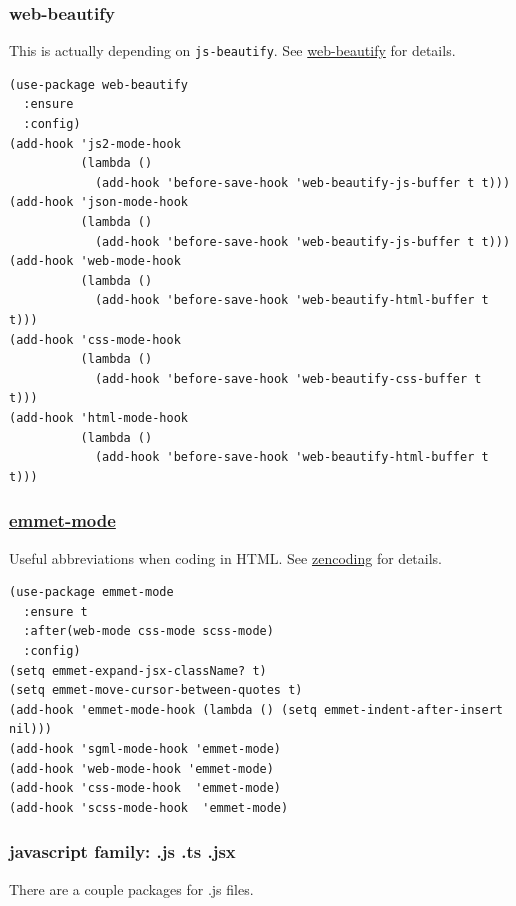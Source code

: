 \documentclass[11pt]{article}
\begin{document}
\subsubsection{web-beautify}
\label{sec:orgb7eb209}
This is actually depending on \texttt{js-beautify}. See \href{https://github.com/yasuyk/web-beautify}{web-beautify} for
details.

\begin{verbatim}
(use-package web-beautify
  :ensure
  :config)
(add-hook 'js2-mode-hook
          (lambda ()
            (add-hook 'before-save-hook 'web-beautify-js-buffer t t)))
(add-hook 'json-mode-hook
          (lambda ()
            (add-hook 'before-save-hook 'web-beautify-js-buffer t t)))
(add-hook 'web-mode-hook
          (lambda ()
            (add-hook 'before-save-hook 'web-beautify-html-buffer t t)))
(add-hook 'css-mode-hook
          (lambda ()
            (add-hook 'before-save-hook 'web-beautify-css-buffer t t)))
(add-hook 'html-mode-hook
          (lambda ()
            (add-hook 'before-save-hook 'web-beautify-html-buffer t t)))
\end{verbatim}
\subsubsection{\href{https://github.com/smihica/emmet-mode}{emmet-mode}}
\label{sec:orgeee6ede}
Useful abbreviations when coding in HTML. See \href{https://github.com/rooney/zencoding}{zencoding} for details.

\begin{verbatim}
(use-package emmet-mode
  :ensure t
  :after(web-mode css-mode scss-mode)
  :config)
(setq emmet-expand-jsx-className? t)
(setq emmet-move-cursor-between-quotes t)
(add-hook 'emmet-mode-hook (lambda () (setq emmet-indent-after-insert nil)))
(add-hook 'sgml-mode-hook 'emmet-mode)
(add-hook 'web-mode-hook 'emmet-mode)
(add-hook 'css-mode-hook  'emmet-mode)
(add-hook 'scss-mode-hook  'emmet-mode)
\end{verbatim}
\subsubsection{javascript family: .js .ts .jsx}
\label{sec:orgddd980e}
There are a couple packages for .js files.
\end{document}
